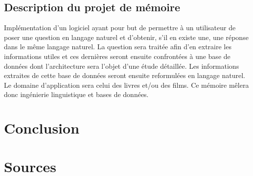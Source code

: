 \documentclass[11pt]{article}
\begin{document}
\subsection{Description du projet de mémoire}
Implémentation d’un logiciel ayant pour but de permettre  à un utilisateur de poser une question en langage naturel et d’obtenir, s’il en existe une, une réponse dans le même langage naturel. La question sera traitée afin d’en extraire les informations utiles et ces dernières seront ensuite confrontées à une base de données dont l’architecture sera l’objet d’une étude détaillée. Les informations extraites de cette base de données seront ensuite reformulées en langage naturel. Le domaine d’application sera celui des livres et/ou des films. Ce mémoire mêlera donc ingénierie linguistique et bases de données.

\section{Conclusion}

\newpage
\section{Sources}
\nocite{*}
\printbibliography
\end{document}
